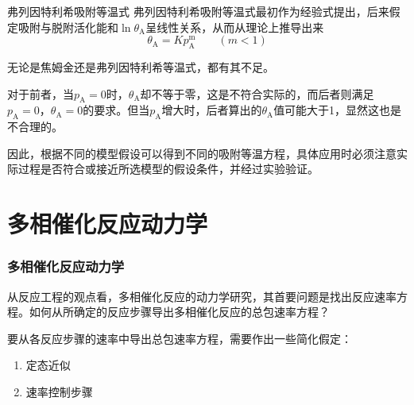 \begin{frame}{弗列因特利希吸附等温式}
    弗列因特利希吸附等温式最初作为经验式提出，后来假定吸附与脱附活化能和$\ln \theta_\mathrm{A}$呈线性关系，从而从理论上推导出来
    $$\theta_\mathrm{A}=Kp_\mathrm{A}^\mathrm{m}\qquad (m<1)$$
    
    无论是焦姆金还是弗列因特利希等温式，都有其不足。
    
    对于前者，当$p_\mathrm{A}=0$时，$\theta_\mathrm{A}$却不等于零，这是不符合实际的，而后者则满足$p_\mathrm{A}=0\text{，}\theta_\mathrm{A}=0$的要求。但当$p_\mathrm{A}$增大时，后者算出的$\theta_\mathrm{A}$值可能大于1，显然这也是不合理的。
    
    因此，根据不同的模型假设可以得到不同的吸附等温方程，具体应用时必须注意实际过程是否符合或接近所选模型的假设条件，并经过实验验证。
\end{frame}


\section{多相催化反应动力学}

\begin{frame}[t]
    \frametitle{多相催化反应动力学}
    \begin{question}
        从反应工程的观点看，多相催化反应的动力学研究，其首要问题是找出反应速率方程。如何从所确定的反应步骤导出多相催化反应的总包速率方程？
    \end{question}
    要从各反应步骤的速率中导出总包速率方程，需要作出一些简化假定：
    \begin{enumerate}
      \item 定态近似
      \item 速率控制步骤
    \end{enumerate}
\end{frame}


